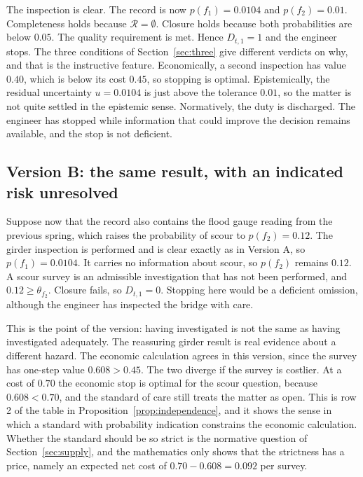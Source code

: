 \documentclass[11pt]{article}
\theoremstyle{plain}
\theoremstyle{definition}
\begin{document}
The inspection is clear. The record is now $p(f_1)=0.0104$ and $p(f_2)=0.01$. Completeness holds because $\mathcal R=\emptyset$. Closure holds because both probabilities are below $0.05$. The quality requirement is met. Hence $D_{t,1}=1$ and the engineer stops. The three conditions of Section~\ref{sec:three} give different verdicts on why, and that is the instructive feature. Economically, a second inspection has value $0.40$, which is below its cost $0.45$, so stopping is optimal. Epistemically, the residual uncertainty $u=0.0104$ is just above the tolerance $0.01$, so the matter is not quite settled in the epistemic sense. Normatively, the duty is discharged. The engineer has stopped while information that could improve the decision remains available, and the stop is not deficient.

\subsection*{Version B: the same result, with an indicated risk unresolved}

Suppose now that the record also contains the flood gauge reading from the previous spring, which raises the probability of scour to $p(f_2)=0.12$. The girder inspection is performed and is clear exactly as in Version A, so $p(f_1)=0.0104$. It carries no information about scour, so $p(f_2)$ remains $0.12$. A scour survey is an admissible investigation that has not been performed, and $0.12\ge\theta_{f_2}$. Closure fails, so $D_{t,1}=0$. Stopping here would be a deficient omission, although the engineer has inspected the bridge with care.

This is the point of the version: having investigated is not the same as having investigated adequately. The reassuring girder result is real evidence about a different hazard. The economic calculation agrees in this version, since the survey has one-step value $0.608>0.45$. The two diverge if the survey is costlier. At a cost of $0.70$ the economic stop is optimal for the scour question, because $0.608<0.70$, and the standard of care still treats the matter as open. This is row 2 of the table in Proposition~\ref{prop:independence}, and it shows the sense in which a standard with probability indication constrains the economic calculation. Whether the standard should be so strict is the normative question of Section~\ref{sec:supply}, and the mathematics only shows that the strictness has a price, namely an expected net cost of $0.70-0.608=0.092$ per survey.
\end{document}

